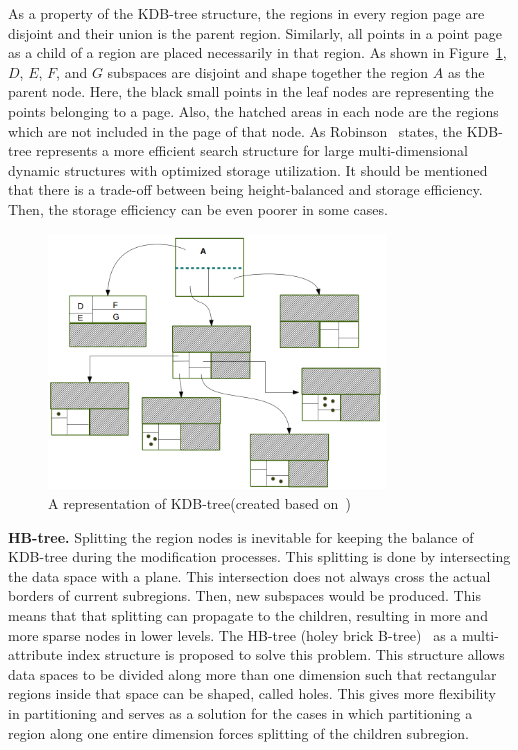 \documentclass[a4paper,12pt]{article}
\begin{document}
As a property of the KDB-tree structure, the regions in every region page are disjoint and their union is the parent region. %
Similarly, all points in a point page as a child of a region are placed necessarily in that region.
As shown in Figure~\ref{figkdbtree}, $D$, $E$, $F$, and $G$ subspaces are disjoint and shape together the region $A$ as the parent node. Here, the black small points in the leaf nodes are representing the points belonging to a page. Also, the hatched areas in each node are the regions which are not included in the page of that node. 
As Robinson~\cite{kdbtree} states, the KDB-tree represents a more efficient search structure for large multi-dimensional dynamic structures with optimized storage utilization. It should be mentioned that there is a trade-off between being height-balanced and storage efficiency. Then, the storage efficiency can be even poorer in some cases.

\begin{figure}
\centering
\includegraphics[width=0.8\textwidth]{kdbtree}
\caption{A representation of KDB-tree(created based on~\cite{kdbtree})}
\label{figkdbtree}
\end{figure}

\textbf{HB-tree.} 
Splitting the region nodes is inevitable for keeping the balance of KDB-tree during the modification processes. This splitting is done by intersecting the data space with a plane. This intersection does not always cross the actual borders of current subregions. Then, new subspaces would be produced. This means that that splitting can propagate to the children, resulting in more and more sparse nodes in lower levels. The HB-tree (holey brick B-tree)~\cite{hbtree1} as a multi-attribute index structure is proposed to solve this problem. This structure allows data spaces to be divided along more than one dimension such that rectangular regions inside that space can be shaped, called holes.
This gives more flexibility in partitioning and serves as a solution for the cases in which partitioning a region along one entire dimension forces splitting of the children subregion. 
\end{document}
